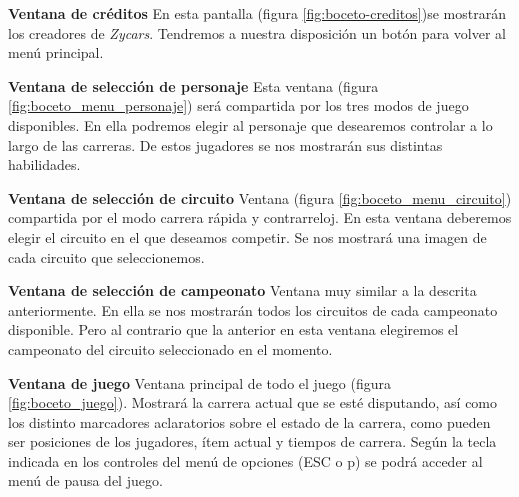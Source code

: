 \begin{description}

    \item \textbf{Ventana de créditos} En esta pantalla (figura \ref{fig:boceto-creditos})se mostrarán los creadores de \emph{Zycars}. Tendremos a nuestra 
    disposición un botón para volver al menú principal.

    
    \item \textbf{Ventana de selección de personaje} Esta ventana (figura \ref{fig:boceto_menu_personaje}) será compartida por los tres modos de juego disponibles. En ella 
    podremos elegir al personaje que desearemos controlar a lo largo de las carreras. De estos jugadores se nos mostrarán sus 
    distintas habilidades.

    
    \item \textbf{Ventana de selección de circuito} Ventana (figura \ref{fig:boceto_menu_circuito}) compartida por el modo carrera rápida y contrarreloj. En esta ventana
    deberemos elegir el circuito en el que deseamos competir. Se nos mostrará una imagen de cada circuito que seleccionemos.

    
    \item \textbf{Ventana de selección de campeonato} Ventana muy similar a la descrita anteriormente. En ella se nos mostrarán
    todos los circuitos de cada campeonato disponible. Pero al contrario que la anterior en esta ventana elegiremos el campeonato 
    del circuito seleccionado en el momento.
    
    \item \textbf{Ventana de juego} Ventana principal de todo el juego (figura \ref{fig:boceto_juego}). Mostrará la carrera actual que se esté disputando, así como
    los distinto marcadores aclaratorios sobre el estado de la carrera, como
    pueden ser posiciones de los jugadores, ítem actual y
    tiempos de carrera. Según la tecla indicada en los controles del menú de opciones (ESC o p) se podrá acceder al menú
    de pausa del juego.


\end{description}
